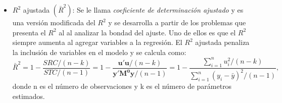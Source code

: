 \documentclass[12pt]{article}
\begin{document}
\begin{itemize}
    \item $R^2$ ajustada $(\bar{R}^2)$: Se le llama \textit{coeficiente de determinación ajustado} y es una versión 
    modificada del $R^2$ y se desarrolla a partir de los problemas que presenta el $R^2$ al 
    al analizar la bondad del ajuste. Uno de ellos es que el $R^2$ siempre aumenta al agregar 
    variables a la regresión. El $R^2$ ajustada penaliza la inclusión de variables en el modelo y se 
    calcula como:
    \begin{equation}
        \bar{R}^2 = 1 - \frac{SRC/(n-k)}{STC/(n-1)} = 1 - \frac{\pmb{u'u}/(n-k)}{\pmb{y'M^0y}/(n-1)} 
        = 1 - \frac{\sum_{i=1}^{n} u_i^2/(n-k)}{\sum_{i=1}^{n} (y_i - \bar{y})^2/(n-1)},
        \label{eq:r_cuadrado_ajustada}
    \end{equation}
    donde n es el número de observaciones y k es el número de parámetros estimados.
\end{itemize}

\end{document}
